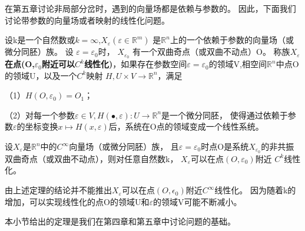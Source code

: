 在第五章讨论非局部分岔时，遇到的向量场都是依赖与参数的。
因此，下面我们讨论带参数的向量场或者映射的线性化问题。

\begin{defination}
设k是一个自然数或\(k=\infty\),$X _ { \varepsilon } \left( \varepsilon \in \mathbb { R } ^ { m } \right)$
是\(\mathbb{R}^n\)上的一个依赖于参数的向量场（或微分同胚）族。
设
\(\varepsilon=\varepsilon_0\)时，
\(X_{\varepsilon_{0}}\)
有一个双曲奇点（或双曲不动点）O。
称族\(X_\varepsilon\)\textbf{在点(O,\(\varepsilon_0\)附近可以\(C^k\)线性化)}，如果存在参数空间\(\varepsilon=\varepsilon_0\)的领域V,相空间\(\mathbb{R}^n\)中点O的领域U，以及一个\(C^k\)映射
$H , U \times V \rightarrow \mathbb { R } ^ { n }$，满足

（1）$H \left( O , \varepsilon _ { 0 } \right) = O _ { 1 }$；

（2）对每一个参数$\varepsilon \in V , H ( \bullet , \varepsilon ) : U \rightarrow \mathbb { R } ^ { n }$是一个微分同胚，
使得通过依赖于参数\(\varepsilon\)的坐标变换$x \mapsto H ( x , \varepsilon )$后，系统在O点的领域变成一个线性系统。
\end{defination}

\begin{theorem}[IY]
  设\(X_\varepsilon\)是\(\mathbb{R}^n\)中的\(C^\infty\)向量场（或微分同胚）族，
  且$\varepsilon = \varepsilon _ { 0 }$时点O是系统$X _ { \varepsilon _ { 0 } }$的非共振双曲奇点（或双曲不动点），则对任意自然数k，
  \(X_\varepsilon\)可以在点$\left( O , \varepsilon _ { 0 } \right)$附近  \(C^k\)线性化。
\end{theorem}

\begin{note}
  由上述定理的结论并不能推出\(X_\varepsilon\)可以在点$\left( O , \epsilon _ { 0 } \right)$附近\(C^\infty\)线性化。
  因为随着k的增加，可以实现线性化的点O的领域U和\(\varepsilon\)的领域V可能不断减小。
\end{note}

本小节给出的定理是我们在第四章和第五章中讨论问题的基础。
